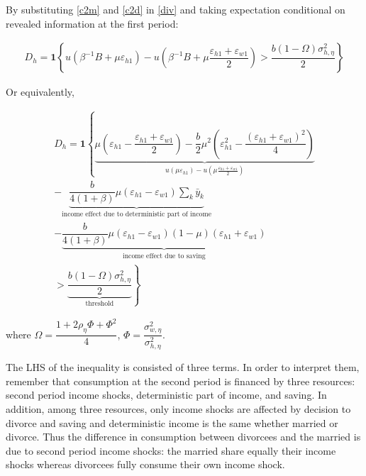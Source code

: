 \noindent By substituting \eqref{c2m} and \eqref{c2d}  in \eqref {div} and taking expectation conditional on revealed information at the first period:

\begin{align*}
D_h = \mathbf 1 \left \{u(\beta^{-1}B + \mu \varepsilon_{h1}) - u(\beta^{-1}B + \mu \dfrac{\varepsilon_{h1} + \varepsilon_{w1}}{2}) > \dfrac{b  (1- \Omega )\sigma^2_{h,\eta}}{2} \right \}
\end{align*}

Or equivalently, 

\begin{align}
D_h = \mathbf  1  \left  \{ \underbrace{  \mu (\varepsilon_{h1} - \dfrac{\varepsilon_{h1} + \varepsilon_{w1}}{2} ) - \dfrac{b}{2} \mu^2 (\varepsilon^2_{h1} - \dfrac{(\varepsilon_{h1} + \varepsilon_{w1})^2}{4})}_{u(\mu \varepsilon_{h1}) - u(\mu \frac{\varepsilon_{h1} + \varepsilon_{w1}}{2})} \right. \nonumber \\
\left.   - \underbrace{  \dfrac{b }{4(1+\beta)}  \mu (\varepsilon_{h1} - \varepsilon_{w1})   \sum_k \bar y_k }_{\text{income effect due to deterministic part of income}}\right. \nonumber \\
\left.   -  \underbrace{\dfrac{b }{4(1+\beta)} \mu (\varepsilon_{h1} - \varepsilon_{w1}) (1-\mu) (\varepsilon_{h1} + \varepsilon_{w1})}_{\text{income effect due to saving}}  \right.  \nonumber \\ 
 \left.     >  \underbrace{\dfrac{b  (1- \Omega )\sigma^2_{h,\eta}}{2}}_{\text{threshold}}   \right \}
\end{align}

 where  $\Omega = \dfrac{1 + 2\rho_\eta \Phi+ \Phi^2}{4}$, $\Phi = \dfrac{\sigma^2_{w,\eta}}{\sigma^2_{h,\eta}}$. %

The LHS of the inequality is consisted of three terms. In order to interpret them, remember that consumption at the second period is financed by three resources: second period income shocks, deterministic part of income, and saving. In addition, among three resources, only income shocks are affected by decision to divorce and saving and deterministic income is the same whether married or divorce. Thus the difference in consumption between divorcees and the married is due to second period income shocks: the married share equally their income shocks whereas divorcees fully consume their own income shock. \\

